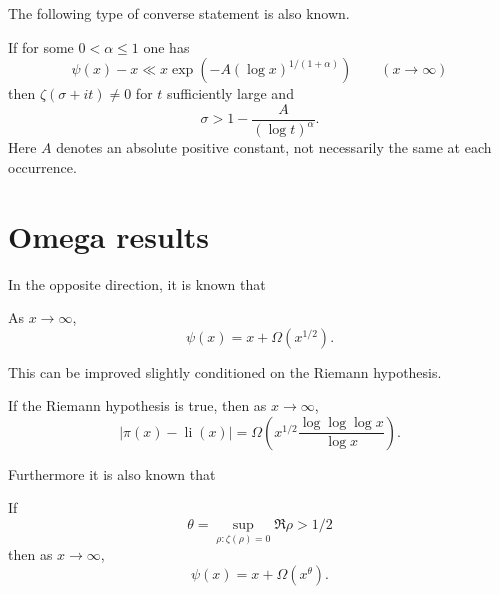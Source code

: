 The following type of converse statement is also known.

\begin{theorem} If for some $0 < \alpha \le 1$ one has
\[
\psi(x) - x \ll x \exp(-A(\log x)^{1/(1 + \alpha)})\qquad (x \to \infty)
\]
then $\zeta(\sigma + it) \ne 0$ for $t$ sufficiently large and
\[
\sigma > 1 - \frac{A}{(\log t)^{\alpha}}.
\]
Here $A$ denotes an absolute positive constant, not necessarily the same at each occurrence.
\end{theorem}


\section{Omega results}

In the opposite direction, it is known that
\begin{theorem}
As $x \to \infty$,
\[
\psi(x) = x + \Omega(x^{1/2}).
\]
\end{theorem}
This can be improved slightly conditioned on the Riemann hypothesis.
\begin{theorem}
If the Riemann hypothesis is true, then as $x \to \infty$,
\[
|\pi(x) - \operatorname{li}(x)| = \Omega\left(x^{1/2}\frac{\log\log\log x}{\log x}\right).
\]
\end{theorem}

Furthermore it is also known that
\begin{theorem}
If
\[
\theta = \sup_{\rho: \zeta(\rho) = 0}\Re \rho > 1/2
\]
then as $x \to \infty$,
\[
\psi(x) = x + \Omega(x^{\theta}).
\]
\end{theorem}
